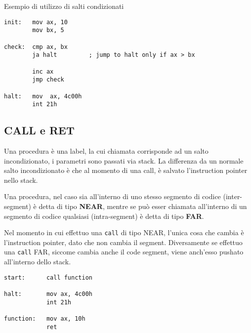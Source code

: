 \documentclass[../template]{subfiles}
\begin{document}
Esempio di utilizzo di salti condizionati
\begin{lstlisting}
init:   mov ax, 10
        mov bx, 5

check:  cmp ax, bx
        ja halt         ; jump to halt only if ax > bx

        inc ax
        jmp check

halt:   mov  ax, 4c00h
        int 21h
\end{lstlisting}

\subsection{CALL e RET}
Una procedura è una label, la cui chiamata corrisponde ad un salto incondizionato, i parametri sono passati via stack.
La differenza da un normale salto incondizionato è che al momento di una call, è salvato l'instruction pointer nello stack.

Una procedura, nel caso sia all'interno di uno stesso segmento di codice (inter-segment) è detta di tipo \textbf{NEAR}, mentre se può esser
chiamata all'interno di un segmento di codice qualsiasi (intra-segment) è detta di tipo \textbf{FAR}.

Nel momento in cui effettuo una \lstinline{call} di tipo NEAR, l'unica cosa che cambia è l'instruction pointer, dato che non cambia il segment.
Diversamente se effettuo una \lstinline{call} FAR, siccome cambia anche il code segment, viene anch'esso pushato all'interno dello stack.

\begin{lstlisting}
start:      call function

halt:       mov ax, 4c00h
            int 21h

function:   mov ax, 10h
            ret
\end{lstlisting}
\end{document}
